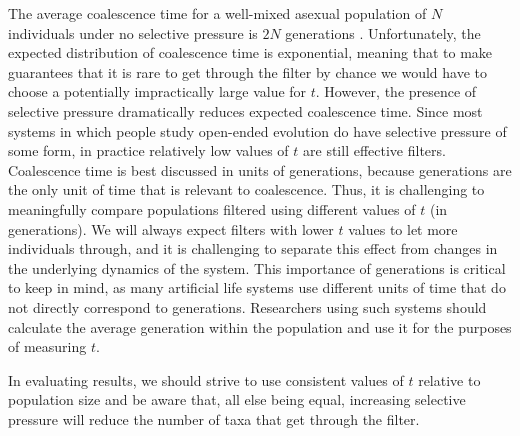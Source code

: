 \documentclass[letterpaper]{article}
\begin{document}
The average coalescence time for a well-mixed asexual population of $N$ individuals under no selective pressure is $2N$ generations \citep{fu_coalescing_1999}.  Unfortunately, the expected distribution of coalescence time is exponential, meaning that to make guarantees that it is rare to get through the filter by chance we would have to choose a potentially impractically large value for $t$. However, the presence of selective pressure dramatically reduces expected coalescence time. Since most systems in which people study open-ended evolution do have selective pressure of some form, in practice relatively low values of $t$ are still effective filters.
%
%
Coalescence time is best discussed in units of generations, because generations are the only unit of time that is relevant to coalescence. Thus, it is challenging to meaningfully compare populations filtered using different values of $t$ (in generations). We will always expect filters with lower $t$ values to let more individuals through, and it is challenging to separate this effect from changes in the underlying dynamics of the system. This importance of generations is critical to keep in mind, as many artificial life systems use different units of time that do not directly correspond to generations. Researchers using such systems should calculate the average generation within the population and use it for the purposes of measuring $t$.

%
In evaluating results, we should strive to use consistent values of $t$ relative to population size and be aware that, all else being equal, increasing selective pressure will reduce the number of taxa that get through the filter.
\end{document}

